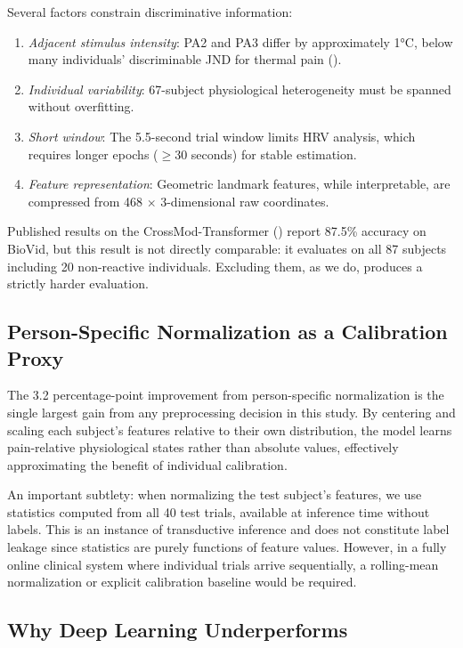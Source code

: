 \documentclass[10pt, twocolumn]{article}
\begin{document}
Several factors constrain discriminative information:
\begin{enumerate}
  \item \textit{Adjacent stimulus intensity}: PA2 and PA3 differ by approximately 1°C,
        below many individuals' discriminable JND for thermal pain (\cite{Yarnitsky1995}).
  \item \textit{Individual variability}: 67-subject physiological heterogeneity must be
        spanned without overfitting.
  \item \textit{Short window}: The 5.5-second trial window limits HRV analysis, which
        requires longer epochs ($\geq$30 seconds) for stable estimation.
  \item \textit{Feature representation}: Geometric landmark features, while interpretable,
        are compressed from 468 $\times$ 3-dimensional raw coordinates.
\end{enumerate}

Published results on the CrossMod-Transformer (\cite{Farmani2025}) report 87.5\% accuracy on
BioVid, but this result is not directly comparable: it evaluates on all 87 subjects
including 20 non-reactive individuals. Excluding them, as we do, produces a strictly
harder evaluation.

\subsection{Person-Specific Normalization as a Calibration Proxy}

The 3.2 percentage-point improvement from person-specific normalization is the single
largest gain from any preprocessing decision in this study. By centering and scaling each
subject's features relative to their own distribution, the model learns pain-relative
physiological states rather than absolute values, effectively approximating the benefit
of individual calibration.

An important subtlety: when normalizing the test subject's features, we use statistics
computed from all 40 test trials, available at inference time without labels. This is an
instance of transductive inference and does not constitute label leakage since statistics
are purely functions of feature values. However, in a fully online clinical system where
individual trials arrive sequentially, a rolling-mean normalization or explicit calibration
baseline would be required.

\subsection{Why Deep Learning Underperforms}
\end{document}
